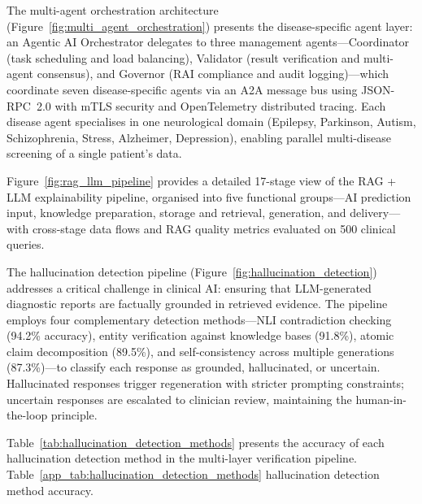 



The multi-agent orchestration architecture (Figure~\ref{fig:multi_agent_orchestration}) presents the disease-specific agent layer: an Agentic AI Orchestrator delegates to three management agents---Coordinator (task scheduling and load balancing), Validator (result verification and multi-agent consensus), and Governor (RAI compliance and audit logging)---which coordinate seven disease-specific agents via an A2A message bus using JSON-RPC~2.0 with mTLS security and OpenTelemetry distributed tracing. Each disease agent specialises in one neurological domain (Epilepsy, Parkinson, Autism, Schizophrenia, Stress, Alzheimer, Depression), enabling parallel multi-disease screening of a single patient's data.



Figure~\ref{fig:rag_llm_pipeline} provides a detailed 17-stage view of the RAG + LLM explainability pipeline, organised into five functional groups---AI prediction input, knowledge preparation, storage and retrieval, generation, and delivery---with cross-stage data flows and RAG quality metrics evaluated on 500 clinical queries.





The hallucination detection pipeline (Figure~\ref{fig:hallucination_detection}) addresses a critical challenge in clinical AI: ensuring that LLM-generated diagnostic reports are factually grounded in retrieved evidence. The pipeline employs four complementary detection methods---NLI contradiction checking (94.2\% accuracy), entity verification against knowledge bases (91.8\%), atomic claim decomposition (89.5\%), and self-consistency across multiple generations (87.3\%)---to classify each response as grounded, hallucinated, or uncertain. Hallucinated responses trigger regeneration with stricter prompting constraints; uncertain responses are escalated to clinician review, maintaining the human-in-the-loop principle.

Table~\ref{tab:hallucination_detection_methods} presents the accuracy of each hallucination detection method in the multi-layer verification pipeline.
\noindent Table~\ref{app_tab:hallucination_detection_methods} hallucination detection method accuracy.

